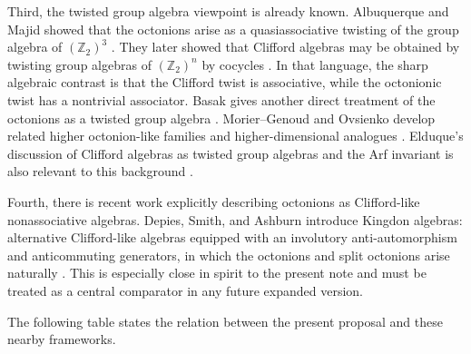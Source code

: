\documentclass[11pt]{article}
\newcommand{\Ztwo}{\mathbb Z_2}
\begin{document}
Third, the twisted group algebra viewpoint is already known. Albuquerque and
Majid showed that the octonions arise as a quasiassociative twisting of the
group algebra of $(\Ztwo)^3$ \cite{AlbuquerqueMajidOctonions}. They later
showed that Clifford algebras may be obtained by twisting group algebras of
$(\Ztwo)^n$ by cocycles \cite{AlbuquerqueMajidClifford}. In that language,
the sharp algebraic contrast is that the Clifford twist is associative, while
the octonionic twist has a nontrivial associator. Basak gives another direct
treatment of the octonions as a twisted group algebra \cite{BasakOctonions}.
Morier--Genoud and Ovsienko develop related higher octonion-like families and
higher-dimensional analogues \cite{MorierGenoudOvsienko}. Elduque's discussion
of Clifford algebras as twisted group algebras and the Arf invariant is also
relevant to this background \cite{ElduqueArf}.

Fourth, there is recent work explicitly describing octonions as Clifford-like
nonassociative algebras. Depies, Smith, and Ashburn introduce Kingdon algebras:
alternative Clifford-like algebras equipped with an involutory anti-automorphism
and anticommuting generators, in which the octonions and split octonions arise
naturally \cite{DepiesSmithAshburn}. This is especially close in spirit to the
present note and must be treated as a central comparator in any future expanded
version.

The following table states the relation between the present proposal and these
nearby frameworks.
\end{document}

